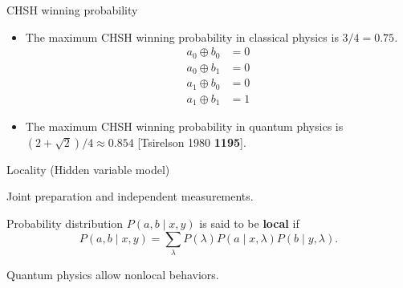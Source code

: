 \documentclass{beamer}
\newcommand\emm[1]{\textcolor{redorange}{{#1}}}
\newcommand\numc[1]{\textcolor{citation}{{\bf #1}}}
\begin{document}
\begin{frame}{CHSH winning probability}
\begin{itemize}
\setlength{\itemsep}{3.5em}
\item The maximum CHSH winning probability in \emm{classical physics} is $3/4=0.75$.\\
\begin{align*}
a_0\oplus b_0 &=0\\
a_0\oplus b_1 &=0\\
a_1\oplus b_0 &=0\\
a_1\oplus b_1 &=1
\end{align*}
\item The maximum CHSH winning probability in \emm{quantum physics} is $(2+\sqrt{2})/4\approx 0.854$
[Tsirelson 1980 \numc{1195}].
\end{itemize}
\end{frame}

\begin{frame}{Locality (Hidden variable model)}
\begin{center}
Joint preparation and independent measurements.
\end{center}
Probability distribution $P(a,b\mid x,y)$ is said to be \textbf{local} if
\begin{equation*}
P(a, b\mid x,y) = \sum_{\lambda} P(\lambda) P(a\mid x, \lambda) P(b\mid y,\lambda).
\end{equation*}
\vspace{2em}
\begin{center}
Quantum physics allow \emm{nonlocal} behaviors.
\end{center}
\end{frame}
\end{document}
